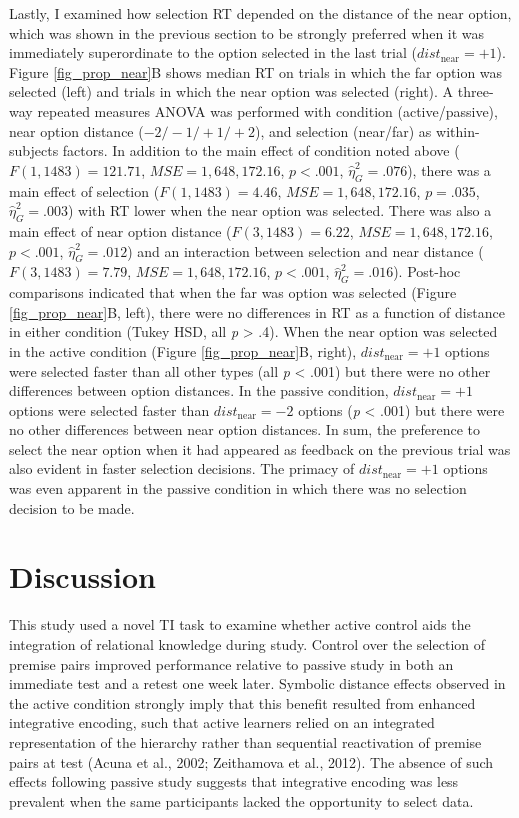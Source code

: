 \documentclass[floatsintext,man]{apa6}
\theoremstyle{definition}
\theoremstyle{definition}
\theoremstyle{definition}
\theoremstyle{remark}
\begin{document}
Lastly, I examined how selection RT depended on the distance of the near
option, which was shown in the previous section to be strongly preferred
when it was immediately superordinate to the option selected in the last
trial (\(dist_{\text{near}}=+1\)). Figure \ref{fig_prop_near}B shows
median RT on trials in which the far option was selected (left) and
trials in which the near option was selected (right). A three-way
repeated measures ANOVA was performed with condition (active/passive),
near option distance (\(-2/-1/+1/+2\)), and selection (near/far) as
within-subjects factors. In addition to the main effect of condition
noted above (\(F(1, 1483) = 121.71\), \(\mathit{MSE} = 1,648,172.16\),
\(p < .001\), \(\hat{\eta}^2_G = .076\)), there was a main effect of
selection (\(F(1, 1483) = 4.46\), \(\mathit{MSE} = 1,648,172.16\),
\(p = .035\), \(\hat{\eta}^2_G = .003\)) with RT lower when the near
option was selected. There was also a main effect of near option
distance (\(F(3, 1483) = 6.22\), \(\mathit{MSE} = 1,648,172.16\),
\(p < .001\), \(\hat{\eta}^2_G = .012\)) and an interaction between
selection and near distance (\(F(3, 1483) = 7.79\),
\(\mathit{MSE} = 1,648,172.16\), \(p < .001\),
\(\hat{\eta}^2_G = .016\)). Post-hoc comparisons indicated that when the
far was option was selected (Figure \ref{fig_prop_near}B, left), there
were no differences in RT as a function of distance in either condition
(Tukey HSD, all \emph{p} \textgreater{} .4). When the near option was
selected in the active condition (Figure \ref{fig_prop_near}B, right),
\(dist_{\text{near}}=+1\) options were selected faster than all other
types (all \emph{p} \textless{} .001) but there were no other
differences between option distances. In the passive condition,
\(dist_{\text{near}}=+1\) options were selected faster than
\(dist_{\text{near}}=-2\) options (\emph{p} \textless{} .001) but there
were no other differences between near option distances. In sum, the
preference to select the near option when it had appeared as feedback on
the previous trial was also evident in faster selection decisions. The
primacy of \(dist_{\text{near}}=+1\) options was even apparent in the
passive condition in which there was no selection decision to be made.

\section{Discussion}\label{discussion}

This study used a novel TI task to examine whether active control aids
the integration of relational knowledge during study. Control over the
selection of premise pairs improved performance relative to passive
study in both an immediate test and a retest one week later. Symbolic
distance effects observed in the active condition strongly imply that
this benefit resulted from enhanced integrative encoding, such that
active learners relied on an integrated representation of the hierarchy
rather than sequential reactivation of premise pairs at test (Acuna et
al., 2002; Zeithamova et al., 2012). The absence of such effects
following passive study suggests that integrative encoding was less
prevalent when the same participants lacked the opportunity to select
data.
\end{document}
